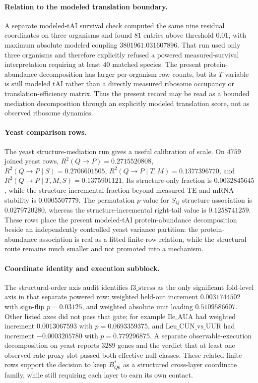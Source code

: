 \paragraph{Relation to the modeled translation boundary.}
A separate modeled-tAI survival check computed the same nine residual coordinates on three organisms and found $81$ entries above threshold $0.01$, with maximum absolute modeled coupling $3801961.031607896$.  That run used only three organisms and therefore explicitly refused a powered measured-survival interpretation requiring at least $40$ matched species.  The present protein-abundance decomposition has larger per-organism row counts, but its $T$ variable is still modeled tAI rather than a directly measured ribosome occupancy or translation-efficiency matrix.  Thus the present record may be read as a bounded mediation decomposition through an explicitly modeled translation score, not as observed ribosome dynamics.

\paragraph{Yeast comparison rows.}
The yeast structure-mediation run gives a useful calibration of scale.  On $4759$ joined yeast rows, $R^2(Q\to P)=0.2715520808$, $R^2(Q\to P\mid S)=0.2706601505$, $R^2(Q\to P\mid T,M)=0.1377396770$, and $R^2(Q\to P\mid T,M,S)=0.1375901121$.  Its structure-only fraction is $0.0032845645$, while the structure-incremental fraction beyond measured TE and mRNA stability is $0.0005507779$.  The permutation $p$-value for $S_Q$ structure association is $0.0279720280$, whereas the structure-incremental right-tail value is $0.1258741259$.  These rows place the present modeled-tAI protein-abundance decomposition beside an independently controlled yeast variance partition: the protein-abundance association is real as a fitted finite-row relation, while the structural route remains much smaller and not promoted into a mechanism.

\paragraph{Coordinate identity and execution subblock.}
The structural-order axis audit identifies $\mathrm{f3\_stress}$ as the only significant fold-level axis in that separate powered row: weighted held-out increment $0.0031744502$ with sign-flip $p=0.03125$, and weighted absolute unit loading $0.5109586607$.  Other listed axes did not pass that gate; for example $\mathrm{Ile\_AUA}$ had weighted increment $0.0013067593$ with $p=0.0693359375$, and $\mathrm{Leu\_CUN\_vs\_UUR}$ had increment $-0.0003205780$ with $p=0.779296875$.  A separate observable-execution decomposition on yeast reports $3289$ genes and the verdict that at least one observed rate-proxy slot passed both effective null classes.  These related finite rows support the decision to keep $B^*_{Q6}$ as a structured cross-layer coordinate family, while still requiring each layer to earn its own contact.

